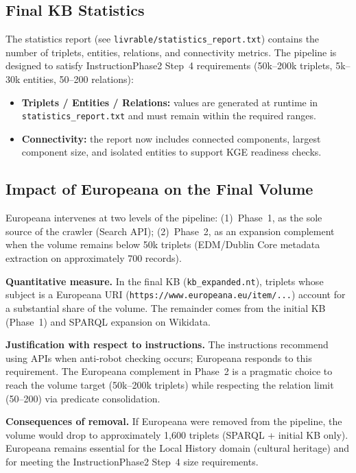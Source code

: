 \documentclass[11pt,a4paper]{article}
\begin{document}
  \subsection{Final KB Statistics}

  The statistics report (see \texttt{livrable/statistics\_report.txt}) contains the number of triplets, entities, relations, and connectivity metrics. The pipeline is designed to satisfy InstructionPhase2 Step~4 requirements (50k--200k triplets, 5k--30k entities, 50--200 relations):

  \begin{itemize}
  \item \textbf{Triplets / Entities / Relations:} values are generated at runtime in \texttt{statistics\_report.txt} and must remain within the required ranges.
  \item \textbf{Connectivity:} the report now includes connected components, largest component size, and isolated entities to support KGE readiness checks.
  \end{itemize}

  \subsection{Impact of Europeana on the Final Volume}

  Europeana intervenes at two levels of the pipeline: (1)~Phase~1, as the sole source of the crawler (Search API); (2)~Phase~2, as an expansion complement when the volume remains below 50k triplets (EDM/Dublin Core metadata extraction on approximately 700 records).

  \textbf{Quantitative measure.} In the final KB (\texttt{kb\_expanded.nt}), triplets whose subject is a Europeana URI (\texttt{https://www.europeana.eu/item/...}) account for a substantial share of the volume. The remainder comes from the initial KB (Phase~1) and SPARQL expansion on Wikidata.

  \textbf{Justification with respect to instructions.} The instructions recommend using APIs when anti-robot checking occurs; Europeana responds to this requirement. The Europeana complement in Phase~2 is a pragmatic choice to reach the volume target (50k--200k triplets) while respecting the relation limit (50--200) via predicate consolidation.

  \textbf{Consequences of removal.} If Europeana were removed from the pipeline, the volume would drop to approximately 1,600 triplets (SPARQL + initial KB only). Europeana remains essential for the Local History domain (cultural heritage) and for meeting the InstructionPhase2 Step~4 size requirements.
\end{document}
